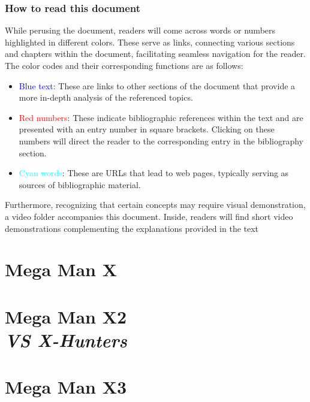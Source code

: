 \documentclass[openany]{report}
\begin{document}
	\section*{How to read this document}
	While perusing the document, readers will come across words or numbers highlighted in different colors. These serve as links, connecting various sections and chapters within the document, facilitating seamless navigation for the reader. The color codes and their corresponding functions are as follows:
	\begin{itemize}
		
	\item \textcolor{blue}{Blue text}: These are links to other sections of the document that provide a more in-depth analysis of the referenced topics.
	
	\item \textcolor{red}{Red numbers}: These indicate bibliographic references within the text and are presented with an entry number in square brackets. Clicking on these numbers will direct the reader to the corresponding entry in the bibliography section.
	
	\item \textcolor{cyan}{Cyan words}: These are URLs that lead to web pages, typically serving as sources of bibliographic material.
	\end{itemize}
	
	Furthermore, recognizing that certain concepts may require visual demonstration, a video folder accompanies this document. Inside, readers will find short video demonstrations complementing the explanations provided in the text
	

\part{Mega Man X}

\label{cha:X1}


\part[Mega Man X2]{Mega Man X2\\[2ex]\Large\itshape{VS X-Hunters}}
\label{cha:X2}

	
\part{Mega Man X3}
\label{cha:X3}

\end{document}
